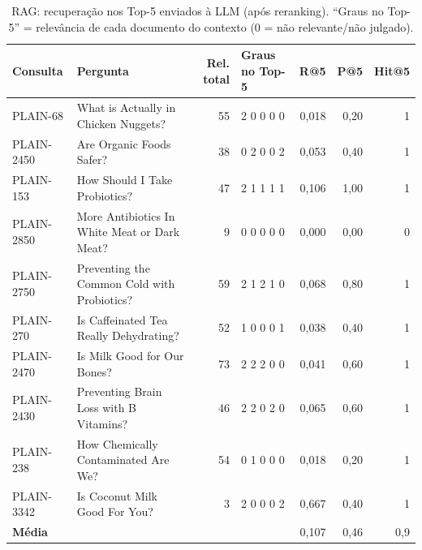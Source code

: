\begin{table}[t]
\centering
\caption{RAG: recuperação nos Top-5 enviados à LLM (após reranking). ``Graus no Top-5'' = relevância de cada documento do contexto (0 = não relevante/não julgado).}
\label{tab:rag_ret}
\scriptsize
\begin{tabular}{llrlrrr}
\toprule
Consulta & Pergunta & Rel. total & Graus no Top-5 & R@5 & P@5 & Hit@5 \\
\midrule
PLAIN-68 & What is Actually in Chicken Nuggets? & 55 & 2 0 0 0 0 & 0,018 & 0,20 & 1 \\
PLAIN-2450 & Are Organic Foods Safer? & 38 & 0 2 0 0 2 & 0,053 & 0,40 & 1 \\
PLAIN-153 & How Should I Take Probiotics? & 47 & 2 1 1 1 1 & 0,106 & 1,00 & 1 \\
PLAIN-2850 & More Antibiotics In White Meat or Dark Meat? & 9 & 0 0 0 0 0 & 0,000 & 0,00 & 0 \\
PLAIN-2750 & Preventing the Common Cold with Probiotics? & 59 & 2 1 2 1 0 & 0,068 & 0,80 & 1 \\
PLAIN-270 & Is Caffeinated Tea Really Dehydrating? & 52 & 1 0 0 0 1 & 0,038 & 0,40 & 1 \\
PLAIN-2470 & Is Milk Good for Our Bones? & 73 & 2 2 2 0 0 & 0,041 & 0,60 & 1 \\
PLAIN-2430 & Preventing Brain Loss with B Vitamins? & 46 & 2 2 0 2 0 & 0,065 & 0,60 & 1 \\
PLAIN-238 & How Chemically Contaminated Are We? & 54 & 0 1 0 0 0 & 0,018 & 0,20 & 1 \\
PLAIN-3342 & Is Coconut Milk Good For You? & 3 & 2 0 0 0 2 & 0,667 & 0,40 & 1 \\
\textbf{Média} &  &  &  & 0,107 & 0,46 & 0,9 \\
\bottomrule
\end{tabular}
\end{table}
